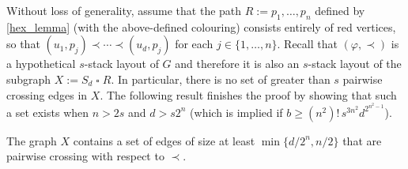 \documentclass[kpfonts]{patmorin}
\renewcommand{\ge}{\geqslant}
\newcommand{\CartProd}{\mathbin{\square}}
\begin{document}

Without loss of generality, assume that the path $R:=p_1,\ldots,p_n$ defined by \cref{hex_lemma} (with the above-defined colouring) consists entirely of red vertices, so that $(u_1,p_j)\prec\cdots\prec (u_d,p_j)$ for each $j\in\{1,\ldots,n\}$.
Recall that $(\varphi,\prec)$ is a hypothetical $s$-stack layout of $G$ and therefore it is also an $s$-stack layout of the subgraph $X:=S_d\CartProd R$. In particular, there is no set of greater than $s$ pairwise crossing edges in $X$. The following result finishes the proof by showing that such a set exists when $n> 2s$ and $d> s2^{n}$ (which is implied if $b \ge (n^2)!\, s^{3n^2}   d^{2^{n^2-1}} $). 

  
\begin{lem}
    The graph $X$ contains a set of edges of size at least $\min\{d/2^{n},n/2\}$ that are pairwise crossing with respect to $\prec$.
\end{lem}
\end{document}
